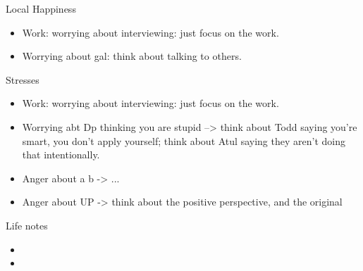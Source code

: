 \documentclass[serif, mathserif, final]{beamer}
\begin{document}
\begin{frame}
\begin{columns}
\begin{column}{0.25\linewidth}
      \begin{block}{Local Happiness}
        \begin{itemize}
          \tiny \item \tiny Work: worrying about interviewing: just focus on the work. 
        \item \tiny Worrying about gal: think about talking to others. 
        \end{itemize}
      \end{block}

      \begin{block}{Stresses}
        \begin{itemize}
          \tiny \item \tiny Work: worrying about interviewing: just focus on the work. 
        \item \tiny Worrying abt Dp thinking you are stupid -->  think
            about Todd saying you're smart, you don't apply yourself; 
            think about Atul saying they aren't doing that
            intentionally. 
          \item \tiny Anger about a b  -> ...
          \item \tiny Anger about UP -> think about the positive
            perspective, and the original
        \end{itemize}
      \end{block}    
      \begin{block}{Life notes}
        \begin{itemize}
        \item \tiny 
        \item \tiny 
        \end{itemize}
      \end{block} 

\end{column} 





\end{columns}
\end{frame}
\end{document}
